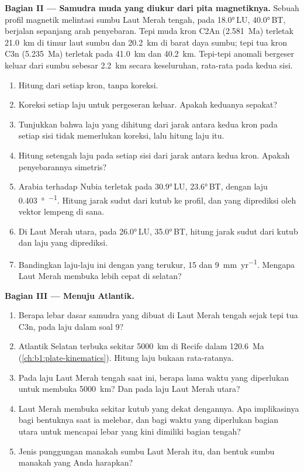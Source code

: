\begin{problem}
\medskip
\noindent\textbf{Bagian II --- Samudra muda yang diukur dari pita magnetiknya.} Sebuah profil magnetik melintasi sumbu Laut Merah tengah, pada \ang{18.0}\,LU, \ang{40.0}\,BT, berjalan sepanjang arah penyebaran. Tepi muda kron C2An (\qty{2.581}{Ma}) terletak \qty{21.0}{km} di timur laut sumbu dan \qty{20.2}{km} di barat daya sumbu; tepi tua kron C3n (\qty{5.235}{Ma}) terletak pada \qty{41.0}{km} dan \qty{40.2}{km}. Tepi-tepi anomali bergeser keluar dari sumbu sebesar \qty{2.2}{km} secara keseluruhan, rata-rata pada kedua sisi.
\begin{enumerate}[resume]
  \item Hitung  dari setiap kron, tanpa koreksi.
  \item Koreksi setiap laju untuk pergeseran keluar. Apakah keduanya sepakat?
  \item Tunjukkan bahwa laju yang dihitung dari jarak antara kedua kron pada setiap sisi tidak memerlukan koreksi, lalu hitung laju itu.
  \item Hitung setengah laju pada setiap sisi dari jarak antara kedua kron. Apakah penyebarannya simetris?
  \item {} Arabia terhadap Nubia terletak pada \ang{30.9}\,LU, \ang{23.6}\,BT, dengan laju \qty{0.403}{\degree\per\Ma}. Hitung jarak sudut dari kutub ke profil, dan  yang diprediksi oleh vektor lempeng di sana.
  \item Di Laut Merah utara, pada \ang{26.0}\,LU, \ang{35.0}\,BT, hitung jarak sudut dari kutub dan laju yang diprediksi.
  \item Bandingkan laju-laju ini dengan yang terukur, 15 dan \qty{9}{mm.yr^{-1}}. Mengapa Laut Merah membuka lebih cepat di selatan?
\end{enumerate}

\medskip
\noindent\textbf{Bagian III --- Menuju Atlantik.}
\begin{enumerate}[resume]
  \item Berapa lebar dasar samudra yang dibuat di Laut Merah tengah sejak tepi tua C3n, pada laju dalam soal 9?
  \item Atlantik Selatan terbuka sekitar \qty{5000}{km} di Recife dalam \qty{120.6}{Ma} (\cref{ch:b1:plate-kinematics}). Hitung laju bukaan rata-ratanya.
  \item Pada laju Laut Merah tengah saat ini, berapa lama waktu yang diperlukan untuk membuka \qty{5000}{km}? Dan pada laju Laut Merah utara?
  \item Laut Merah membuka sekitar kutub yang dekat dengannya. Apa implikasinya bagi bentuknya saat ia melebar, dan bagi waktu yang diperlukan bagian utara untuk mencapai lebar yang kini dimiliki bagian tengah?
  \item Jenis punggungan manakah sumbu Laut Merah itu, dan bentuk sumbu manakah yang Anda harapkan?
\end{enumerate}


\end{problem}
